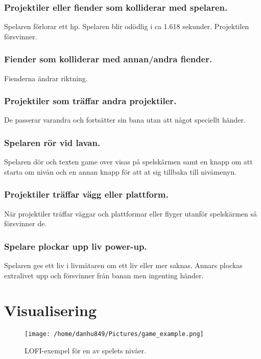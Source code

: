 \documentclass{TDP005mall}
\begin{document}
\subsubsection{Projektiler eller fiender som kolliderar med spelaren.}
Spelaren förlorar ett hp. Spelaren blir odödlig i ca 1.618 sekunder. Projektilen försvinner.

\subsubsection{Fiender som kolliderar med annan/andra fiender.}
Fienderna ändrar riktning.

\subsubsection{Projektiler som träffar andra projektiler.}
De passerar varandra och fortsätter sin bana utan att något speciellt händer.


\subsubsection{Spelaren rör vid lavan.}
Spelaren dör och texten game over visas på spelskärmen samt en knapp om att starta om nivån och en annan knapp för att at sig tillbaka till nivåmenyn.

\subsubsection{Projektiler träffar vägg eller plattform.}
När projektiler träffar väggar och plattformar eller flyger utanför spelskärmen så försvinner de.

\subsubsection{Spelare plockar upp liv power-up.}
Spelaren ges ett liv i livmätaren om ett liv eller mer saknas. Annars plockas extralivet upp och försvinner från banan men ingenting händer.

\newpage
\section{Visualisering}%

\begin{figure}[h!]
  \centerline{\texttt{[image: /home/danhu849/Pictures/game\_example.png]}}
  \caption{LOFI-exempel för en av spelets nivåer.\label{fig}}
\end{figure}
\end{document}
